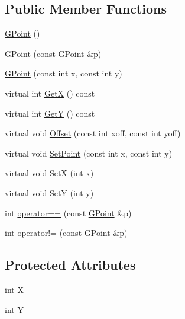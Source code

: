 \subsection*{Public Member Functions}
\begin{DoxyCompactItemize}
\item 
\mbox{\hyperlink{class_g_point_a8454b1fc2b2094d4cf5fd8d57a9114d9}{G\+Point}} ()
\item 
\mbox{\hyperlink{class_g_point_a8198edcc7b38e155c8f1e117ca912fcb}{G\+Point}} (const \mbox{\hyperlink{class_g_point}{G\+Point}} \&p)
\item 
\mbox{\hyperlink{class_g_point_a9344fd1bded86e274aad88fd85e0ee15}{G\+Point}} (const int x, const int y)
\item 
virtual int \mbox{\hyperlink{class_g_point_a1abafe0e52e3f7039bbe0c0acbb5a9a9}{GetX}} () const
\item 
virtual int \mbox{\hyperlink{class_g_point_a0b40736448fc178ac2406875bd524a2c}{GetY}} () const
\item 
virtual void \mbox{\hyperlink{class_g_point_a8098fbfa3ada3a81e07313b2b4de1427}{Offset}} (const int xoff, const int yoff)
\item 
virtual void \mbox{\hyperlink{class_g_point_ad6f78b03b847082c2e2feb0a3612f0c5}{Set\+Point}} (const int x, const int y)
\item 
virtual void \mbox{\hyperlink{class_g_point_aa2e1b46333fea1d31b1db8eea7a4bbd6}{SetX}} (int x)
\item 
virtual void \mbox{\hyperlink{class_g_point_a20d2d7826baf36fe4b8f73b88d75cf7d}{SetY}} (int y)
\item 
int \mbox{\hyperlink{class_g_point_ae28ae2bca94c3b0906c3336c10545c94}{operator==}} (const \mbox{\hyperlink{class_g_point}{G\+Point}} \&p)
\item 
int \mbox{\hyperlink{class_g_point_a7294abba5e2a5a7caa75e3967e07cbb5}{operator!=}} (const \mbox{\hyperlink{class_g_point}{G\+Point}} \&p)
\end{DoxyCompactItemize}
\subsection*{Protected Attributes}
\begin{DoxyCompactItemize}
\item 
int \mbox{\hyperlink{class_g_point_a0a26572e08c37a5e7e6854ae8c7fee66}{X}}
\item 
int \mbox{\hyperlink{class_g_point_aca224bb9b30fab3b59cd25a9261c1069}{Y}}
\end{DoxyCompactItemize}


